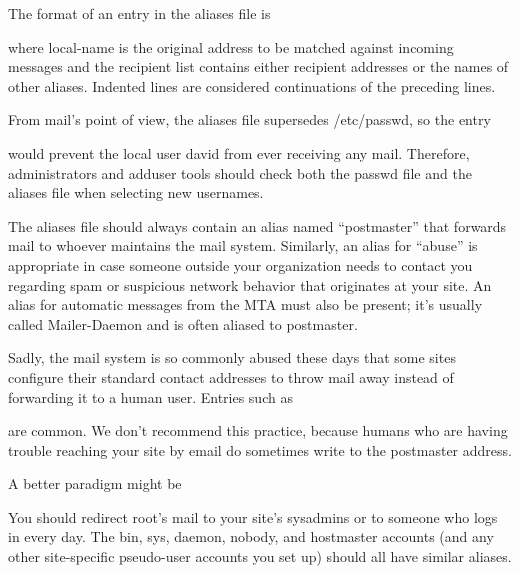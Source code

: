 The format of an entry in the {aliases} file is


where {local-name} is the original address to be matched against
incoming messages and the recipient list contains either recipient
addresses or the names of other aliases. Indented lines are considered
continuations of the preceding lines.

From mail's point of view, the {aliases} file supersedes {/etc/passwd},
so the entry


would prevent the local user david from ever receiving any mail.
Therefore, administrators and {adduser} tools should check both the
{passwd} file and the {aliases} file when selecting new usernames.

\protect\hypertarget{part0026_split_018.htmlux5cux23_idIndexMarker2471}{}{}\protect\hypertarget{part0026_split_018.htmlux5cux23_idIndexMarker2472}{}{}The
{aliases} file should always contain an alias named
``\protect\hypertarget{part0026_split_018.htmlux5cux23_idIndexMarker2473}{}{}postmaster''
that forwards mail to whoever maintains the mail system. Similarly, an
alias for ``abuse'' is appropriate in case someone outside your
organization needs to contact you regarding spam or suspicious network
behavior that originates at your site. An alias for automatic messages
from the MTA must also be present; it's usually called Mailer-Daemon and
is often aliased to postmaster.

Sadly, the mail system is so commonly abused these days that some sites
configure their standard contact addresses to throw mail away instead of
forwarding it to a human user. Entries such as


are common. We don't recommend this practice, because humans who are
having trouble reaching your site by email do sometimes write to the
postmaster address.

A better paradigm might
be\protect\hypertarget{part0026_split_018.htmlux5cux23_idIndexMarker2474}{}{}


You should redirect root's mail to your site's sysadmins or to someone
who logs in every day. The bin, sys, daemon, nobody, and hostmaster
accounts (and any other site-specific pseudo-user accounts you set up)
should all have similar aliases.

